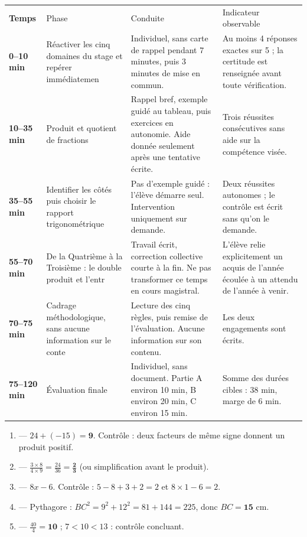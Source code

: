 \documentclass[10pt,a4paper]{article}
\begin{document}
\par\noindent\begin{tabularx}{\linewidth}{>{\bfseries}p{18mm} p{34mm} X X}
\rowcolor{Navy}\color{white}Temps & \color{white}Phase & \color{white}Conduite & \color{white}Indicateur observable \\
0--10 min & Réactiver les cinq domaines du stage et repérer immédiatemen & Individuel, sans carte de rappel pendant 7 minutes, puis 3 minutes de mise en commun. & Au moins 4 réponses exactes sur 5 ; la certitude est renseignée avant toute vérification. \\
10--35 min & Produit et quotient de fractions & Rappel bref, exemple guidé au tableau, puis exercices en autonomie. Aide donnée seulement après une tentative écrite. & Trois réussites consécutives sans aide sur la compétence visée. \\
35--55 min & Identifier les côtés puis choisir le rapport trigonométrique & Pas d'exemple guidé : l'élève démarre seul. Intervention uniquement sur demande. & Deux réussites autonomes ; le contrôle est écrit sans qu'on le demande. \\
55--70 min & De la Quatrième à la Troisième : le double produit et l'entr & Travail écrit, correction collective courte à la fin. Ne pas transformer ce temps en cours magistral. & L'élève relie explicitement un acquis de l'année écoulée à un attendu de l'année à venir. \\
70--75 min & Cadrage méthodologique, sans aucune information sur le conte & Lecture des cinq règles, puis remise de l'évaluation. Aucune information sur son contenu. & Les deux engagements sont écrits. \\
75--120 min & Évaluation finale & Individuel, sans document. Partie A environ 10 min, B environ 20 min, C environ 15 min. & Somme des durées cibles : 38 min, marge de 6 min. \\
\end{tabularx}
\newpage{}
\begin{enumerate}
\item {} --- $24 + (-15) = \mathbf{9}$. Contrôle : deux facteurs de même signe donnent un produit positif.
\item {} --- $\frac{3\times 8}{4\times 9}=\frac{24}{36}=\mathbf{\frac{2}{3}}$ (ou simplification avant le produit).
\item {} --- $8x-6$. Contrôle : $5-8+3+2=2$ et $8\times 1-6=2$.
\item {} --- Pythagore : $BC^2=9^2+12^2=81+144=225$, donc $BC=\mathbf{15}$ cm.
\item {} --- $\frac{40}{4}=\mathbf{10}$ ; $7 < 10 < 13$ : contrôle concluant.
\end{enumerate}
\end{document}
